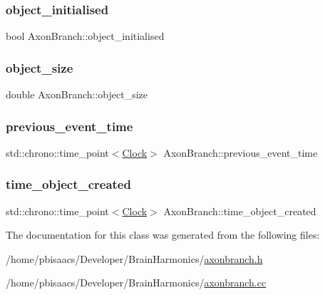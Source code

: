 \subsubsection{\texorpdfstring{object\+\_\+initialised}{object\_initialised}}
{\footnotesize\ttfamily bool Axon\+Branch\+::object\+\_\+initialised\hspace{0.3cm}{\ttfamily [private]}}

\mbox{\label{classAxonBranch_a7c7b6c5f08a20bc956d37b01b183c4d8}} 
\subsubsection{\texorpdfstring{object\+\_\+size}{object\_size}}
{\footnotesize\ttfamily double Axon\+Branch\+::object\+\_\+size\hspace{0.3cm}{\ttfamily [private]}}

\mbox{\label{classAxonBranch_a6a1607a44a26b4277a7f0fc32cafb530}} 
\subsubsection{\texorpdfstring{previous\+\_\+event\+\_\+time}{previous\_event\_time}}
{\footnotesize\ttfamily std\+::chrono\+::time\+\_\+point$<$\mbox{\hyperlink{universe_8h_a0ef8d951d1ca5ab3cfaf7ab4c7a6fd80}{Clock}}$>$ Axon\+Branch\+::previous\+\_\+event\+\_\+time\hspace{0.3cm}{\ttfamily [private]}}

\mbox{\label{classAxonBranch_af57a6117490f6cf20ba22c9d107cabfb}} 
\subsubsection{\texorpdfstring{time\+\_\+object\+\_\+created}{time\_object\_created}}
{\footnotesize\ttfamily std\+::chrono\+::time\+\_\+point$<$\mbox{\hyperlink{universe_8h_a0ef8d951d1ca5ab3cfaf7ab4c7a6fd80}{Clock}}$>$ Axon\+Branch\+::time\+\_\+object\+\_\+created\hspace{0.3cm}{\ttfamily [private]}}



The documentation for this class was generated from the following files\+:\begin{DoxyCompactItemize}
\item 
/home/pbisaacs/\+Developer/\+Brain\+Harmonics/\mbox{\hyperlink{axonbranch_8h}{axonbranch.\+h}}\item 
/home/pbisaacs/\+Developer/\+Brain\+Harmonics/\mbox{\hyperlink{axonbranch_8cc}{axonbranch.\+cc}}\end{DoxyCompactItemize}
